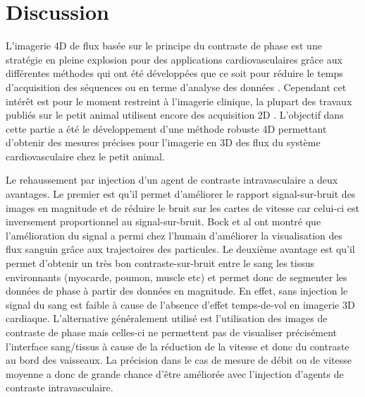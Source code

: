 \section{Discussion}

L'imagerie 4D de flux basée sur le principe du contraste de phase est une stratégie en pleine explosion \cite{Stankovic:2014aa,Garcia:2014aa,Petersson:2015aa} pour des applications cardiovasculaires grâce aux différentes méthodes qui ont été développées que ce soit pour réduire le temps d'acquisition des séquences \cite{Liu:2014aa} ou en terme d'analyse des données \cite{Eriksson:2010aa}. Cependant cet intérêt est pour le moment restreint à l'imagerie clinique, la plupart des travaux publiés sur le petit animal utilisent encore des acquisition 2D \cite{Zhao:2009ng}. 
L'objectif dans cette partie a été le développement d'une méthode robuste 4D permettant d'obtenir des mesures précises pour l'imagerie en 3D des flux du système cardiovasculaire chez le petit animal.

Le rehaussement par injection d'un agent de contraste intravasculaire a deux avantages. Le premier est qu'il permet d'améliorer le rapport signal-sur-bruit des images en magnitude et de réduire le bruit sur les cartes de vitesse car celui-ci est inversement proportionnel au signal-sur-bruit. Bock et al \cite{Bock:2010aa} ont montré que l'amélioration du signal a permi chez l'humain d'améliorer la visualisation des flux sanguin grâce aux trajectoires des particules. 
Le deuxième avantage est qu'il permet d'obtenir un très bon contraste-sur-bruit entre le sang les tissus environnants (myocarde, poumon, muscle etc) et permet donc de segmenter les données de phase à partir des données en magnitude.  En effet, sans injection le signal du sang est faible à cause de l'absence d'effet temps-de-vol en imagerie 3D cardiaque. L'alternative généralement utilisé est l'utilisation des images de contraste de phase mais celles-ci ne permettent pas de visualiser précisément l'interface sang/tissus à cause de la réduction de la vitesse et donc du contraste au bord des vaisseaux. La précision dans le cas de mesure de débit ou de vitesse moyenne a donc de grande chance d'être améliorée avec l'injection d'agents de contraste intravasculaire.

